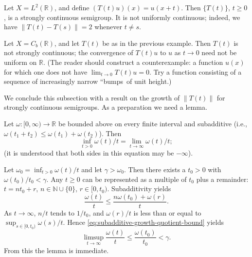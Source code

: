 \begin{Example}
\label{ex:ltwo-translation-semigroup}
Let $X=L^2(\mathbb{R})$, and define $(T(t)u)(x)=u(x+t)$. Then $\{T(t)\}$, $t\geq0$, is a strongly continuous semigroup. It is not uniformly continuous; indeed, we have $\|T(t)-T(s)\|=2$ whenever $t\neq s$.
\end{Example}

\begin{Example}
\label{ex:bounded-continuous-translation-not-strongly-continuous}
Let $X=C_b(\mathbb{R})$, and let $T(t)$ be as in the previous example. Then $T(t)$ is not strongly continuous; the convergence of $T(t)u$ to $u$ as $t\to0$ need not be uniform on $\mathbb{R}$. (The reader should construct a counterexample: a function $u(x)$ for which one does not have $\lim_{t\to0}T(t)u=0$. Try a function consisting of a sequence of increasingly narrow ``bumps\textquotesingle\textquotesingle\ of unit height.)
\end{Example}

We conclude this subsection with a result on the growth of $\|T(t)\|$ for strongly continuous semigroups. As a preparation we need a lemma.

\begin{Lemma}
\label{lem:subadditive-growth-limit}
Let $\omega:[0,\infty)\to\mathbb{R}$ be bounded above on every finite interval and subadditive (i.e., $\omega(t_1+t_2)\leq\omega(t_1)+\omega(t_2)$). Then\[\inf_{t>0}\omega(t)/t=\lim_{t\to\infty}\omega(t)/t;\](it is understood that both sides in this equation may be $-\infty$).
\end{Lemma}

\begin{Proof}
Let $\omega_0=\inf_{t>0}\omega(t)/t$ and let $\gamma>\omega_0$. Then there exists a $t_0>0$ with $\omega(t_0)/t_0<\gamma$. Any $t\geq0$ can be represented as a multiple of $t_0$ plus a remainder: $t=nt_0+r$, $n\in\mathbb{N}\cup\{0\}$, $r\in[0,t_0)$. Subadditivity yields
\begin{equation}\label{eq:subadditive-growth-quotient-bound}
\dfrac{\omega(t)}{t}\leq\dfrac{n\omega(t_0)+\omega(r)}{t}.
\end{equation}
As $t\to\infty$, $n/t$ tends to $1/t_0$, and $\omega(r)/t$ is less than or equal to $\sup_{s\in[0,t_0)}\omega(s)/t$. Hence \eqref{eq:subadditive-growth-quotient-bound} yields
\begin{equation}\label{eq:subadditive-growth-limsup-bound}
\limsup_{t\to\infty}\dfrac{\omega(t)}{t}\leq\dfrac{\omega(t_0)}{t_0}<\gamma.
\end{equation}
From this the lemma is immediate.
\end{Proof}


